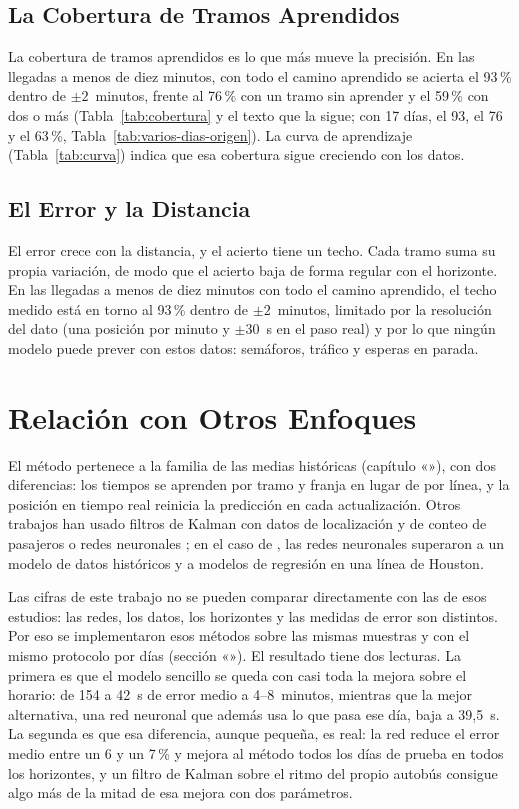 \subsection{La Cobertura de Tramos Aprendidos} La cobertura de tramos aprendidos es lo que más mueve la precisión. En
las llegadas a menos de diez minutos, con todo el camino aprendido se acierta el 93\,\% dentro de $\pm2$~minutos,
frente al 76\,\% con un tramo sin aprender y el 59\,\% con dos o más (Tabla~\ref{tab:cobertura} y el texto que la sigue; con 17 días, el 93, el 76 y el 63\,\%,
Tabla~\ref{tab:varios-dias-origen}). La curva de aprendizaje (Tabla~\ref{tab:curva}) indica que esa
cobertura sigue creciendo con los datos.

\subsection{El Error y la Distancia} El error crece con la distancia, y el acierto tiene un techo. Cada tramo suma su
propia variación, de modo que el
acierto baja de forma regular con el horizonte. En las llegadas a menos de diez minutos con todo el camino aprendido, el techo medido
está en torno al 93\,\% dentro de $\pm2$~minutos, limitado por la resolución del dato (una posición por minuto y $\pm30$~s en el paso real) y por lo que
ningún modelo puede prever con estos datos: semáforos, tráfico y esperas en parada.

\section{Relación con Otros Enfoques}
\label{sec:otros-enfoques}

El método pertenece a la familia de las medias históricas (capítulo «»), con dos
diferencias: los tiempos se aprenden por tramo y franja en lugar de por línea, y la posición en tiempo real reinicia la
predicción en cada actualización. Otros trabajos han usado filtros de Kalman con datos de localización y de conteo de
pasajeros \citep{shalaby2004} o redes neuronales \citep{chien2002,jeong2005}; en el caso de \citet{jeong2005}, las
redes neuronales superaron a un modelo de datos históricos y a modelos de regresión en una línea de Houston.

Las cifras de este trabajo no se pueden comparar directamente con las de esos estudios: las redes, los datos, los
horizontes y las medidas de error son distintos. Por eso se implementaron esos métodos sobre las mismas muestras y con
el mismo protocolo por días (sección «»). El resultado tiene dos lecturas. La primera es que
el modelo sencillo se queda con casi toda la mejora sobre el horario: de 154 a 42~s de error medio a 4--8~minutos,
mientras que la mejor alternativa, una red neuronal que además usa lo que pasa ese día, baja a 39,5~s. La segunda es
que esa diferencia, aunque pequeña, es real: la red reduce el error medio entre un 6 y un 7\,\% y mejora al método
todos los días de prueba en todos los horizontes, y un filtro de Kalman sobre el ritmo del propio autobús consigue algo más de la mitad de esa mejora con dos
parámetros.

